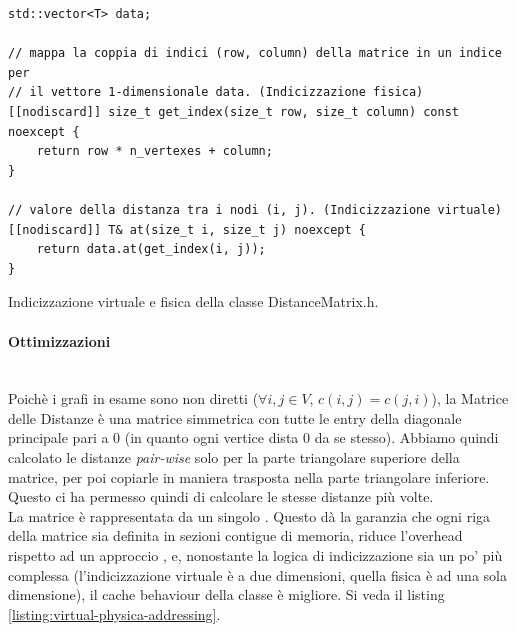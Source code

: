 \begin{listing}[!ht]
\begin{verbatim}
std::vector<T> data;

// mappa la coppia di indici (row, column) della matrice in un indice per
// il vettore 1-dimensionale data. (Indicizzazione fisica)
[[nodiscard]] size_t get_index(size_t row, size_t column) const noexcept {
    return row * n_vertexes + column;
}

// valore della distanza tra i nodi (i, j). (Indicizzazione virtuale)
[[nodiscard]] T& at(size_t i, size_t j) noexcept {
    return data.at(get_index(i, j));
}
\end{verbatim}
\caption{Indicizzazione virtuale e fisica della classe DistanceMatrix.h.}
\label{listing:virtual-physica-addressing}
\end{listing}

\paragraph{Ottimizzazioni}\mbox{} \\

\noindent Poichè i grafi in esame sono non diretti ($\forall i,j \in V$, $c(i,j) = c(j,i)$), la Matrice delle Distanze è una matrice simmetrica con tutte le entry della diagonale principale pari a 0 (in quanto ogni vertice dista 0 da se stesso).
Abbiamo quindi calcolato le distanze \textit{pair-wise} solo per la parte triangolare superiore della matrice, per poi copiarle in maniera trasposta nella parte triangolare inferiore. Questo ci ha permesso quindi di calcolare le stesse distanze più volte. \\

\noindent La matrice è rappresentata da un singolo . Questo dà la garanzia che ogni riga della matrice sia definita in sezioni contigue di memoria, riduce l'overhead rispetto ad un approccio , e, nonostante la logica di indicizzazione sia un po' più complessa (l'indicizzazione virtuale è a due dimensioni, quella fisica è ad una sola dimensione), il cache behaviour della classe è migliore. Si veda il listing \ref{listing:virtual-physica-addressing}.

